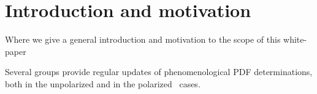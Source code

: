 \section{Introduction and motivation}

Where we give a general introduction and motivation
to the scope of this white-paper


Several groups provide regular updates of
phenomenological PDF determinations, both
in the unpolarized and in the polarized~\cite{Nocera:2014gqa} cases.
